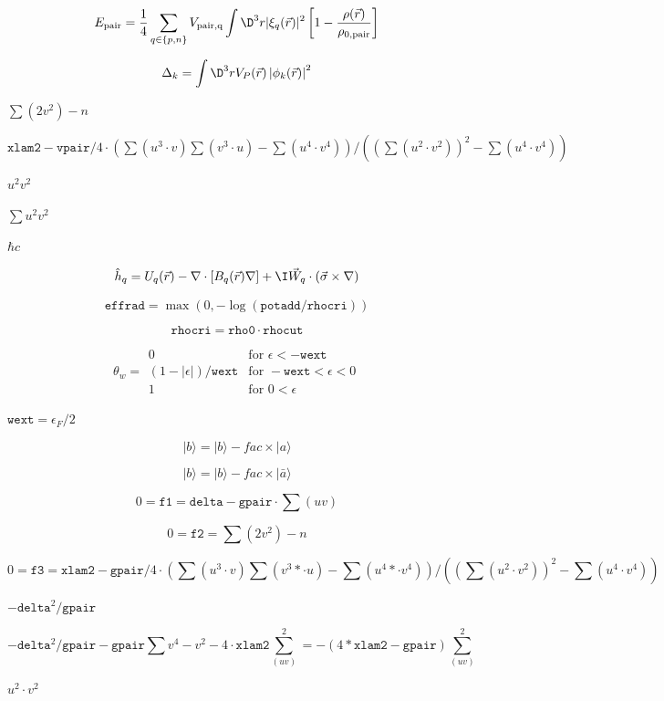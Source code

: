 \documentclass{article}
\begin{document}
\[ E_{\rm pair}=\frac{1}{4} \sum_{q\in\{p,n\}}V_\mathrm{pair,q} \int \D^3r |\xi_q(\vec r)|^2 \left[1 -\frac{\rho(\vec r)}{\rho_{0,\mathrm{pair}}}\right]\]
\pagebreak

\[ \Delta_k=\int\D^3r V_P(\vec r)\left|\phi_k(\vec r)\right|^2\]
\pagebreak

$ \sum(2v^2)-n $
\pagebreak

$ \texttt{xlam2}-\texttt{vpair}/4\cdot (\sum(u^3\cdot v)\sum(v^3\cdot u)- \sum(u^4\cdot v^4))/((\sum(u^2\cdot v^2))^2-\sum(u^4\cdot v^4)) $
\pagebreak

$ u^2v^2 $
\pagebreak

$ \sum u^2v^2 $
\pagebreak

$ \hbar c $
\pagebreak

\[ \hat h_q = U_q(\vec r)-\nabla\cdot\left[B_q(\vec r)\nabla\right] +\I\vec W_q\cdot(\vec\sigma\times\nabla) \]
\pagebreak

\[ \texttt{effrad} = \max(0,-\log(\texttt{potadd}/\texttt{rhocri})) \]
\pagebreak

\[ \texttt{rhocri} = \texttt{rho0}\cdot\texttt{rhocut} \]
\pagebreak

\[\theta_w=\begin{array}{lr} 0 & \mbox{for }\epsilon < -\texttt{wext}\\ (1-|\epsilon|)/\texttt{wext} & \mbox{for }-\texttt{wext} < \epsilon < 0\\ 1 & \mbox{for }0 < \epsilon \end{array} \]
\pagebreak

$ \texttt{wext} = \epsilon_F/2 $
\pagebreak

\[ |b\rangle = |b\rangle - fac \times |a\rangle \]
\pagebreak

\[ |b\rangle = |b\rangle - fac \times |\bar{a}\rangle \]
\pagebreak

\[ 0 = \texttt{f1} = \texttt{delta}-\texttt{gpair}\cdot \sum(uv) \]
\pagebreak

\[ 0 = \texttt{f2} = \sum(2v^2)-n \]
\pagebreak

\[ 0 = \texttt{f3} = \texttt{xlam2}-\texttt{gpair}/4 \cdot (\sum(u^3\cdot v)\sum(v^3* \cdot u)-\sum(u^4*\cdot v^4))/ ((\sum(u^2\cdot v^2))^2 - \sum(u^4 \cdot v^4)) \]
\pagebreak

$ - \texttt{delta}^2/\texttt{gpair} $
\pagebreak

\[-\texttt{delta}^2/\texttt{gpair}-\texttt{gpair}\sum{v^4-v^2}-4\cdot \texttt{xlam2} \sum_(uv)^2= -(4*\texttt{xlam2}-\texttt{gpair})\sum_(uv)^2 \]
\pagebreak

$ u^2\cdot v^2 $
\pagebreak
\end{document}
